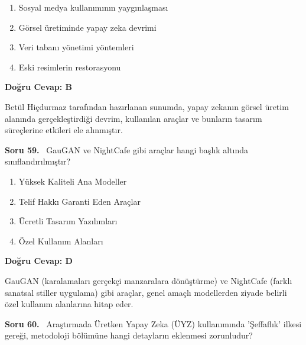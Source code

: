 \documentclass[11pt,a4paper,openany]{book}
\begin{document}
\begin{enumerate}[label=\Alph*), leftmargin=25pt, topsep=4pt, itemsep=2pt]
        \item Sosyal medya kullanımının yaygınlaşması
        \item Görsel üretiminde yapay zeka devrimi
        \item Veri tabanı yönetimi yöntemleri
        \item Eski resimlerin restorasyonu
\end{enumerate}

\vspace{4pt}
\begin{tcolorbox}[title=Cevap ve Açıklama, colback=gray!3!white, colframe=primarycolor!90!black, arc=2mm, fonttitle=\bfseries\sffamily, top=6pt, bottom=6pt]
    \textbf{Doğru Cevap: B}

    \vspace{2pt}
    Betül Hiçdurmaz tarafından hazırlanan sunumda, yapay zekanın görsel üretim alanında gerçekleştirdiği devrim, kullanılan araçlar ve bunların tasarım süreçlerine etkileri ele alınmıştır.
\end{tcolorbox}
\vspace{10pt}
\needspace{5cm}
\vspace{8pt}
\noindent\textbf{\large\sffamily Soru 59.} \ GauGAN ve NightCafe gibi araçlar hangi başlık altında sınıflandırılmıştır?

\begin{enumerate}[label=\Alph*), leftmargin=25pt, topsep=4pt, itemsep=2pt]
        \item Yüksek Kaliteli Ana Modeller
        \item Telif Hakkı Garanti Eden Araçlar
        \item Ücretli Tasarım Yazılımları
        \item Özel Kullanım Alanları
\end{enumerate}

\vspace{4pt}
\begin{tcolorbox}[title=Cevap ve Açıklama, colback=gray!3!white, colframe=primarycolor!90!black, arc=2mm, fonttitle=\bfseries\sffamily, top=6pt, bottom=6pt]
    \textbf{Doğru Cevap: D}

    \vspace{2pt}
    GauGAN (karalamaları gerçekçi manzaralara dönüştürme) ve NightCafe (farklı sanatsal stiller uygulama) gibi araçlar, genel amaçlı modellerden ziyade belirli özel kullanım alanlarına hitap eder.
\end{tcolorbox}
\vspace{10pt}
\needspace{5cm}
\vspace{8pt}
\noindent\textbf{\large\sffamily Soru 60.} \ Araştırmada Üretken Yapay Zeka (ÜYZ) kullanımında 'Şeffaflık' ilkesi gereği, metodoloji bölümüne hangi detayların eklenmesi zorunludur?
\end{document}
